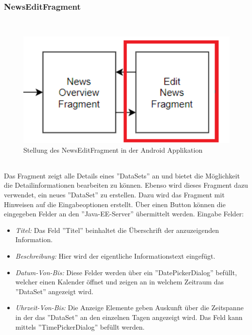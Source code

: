 \subsubsection{NewsEditFragment}
\\
\begin{figure}[H]
\centering
\includegraphics[width=1.0\textwidth]{images/06_AndroidApp/06_NewsEditStellung}
\caption{Stellung des NewsEditFragment in der Android Applikation}
\label{fig:mediaNav}
\end{figure}
\\
Das Fragment zeigt alle Details eines ''DataSets'' an und bietet die Möglichkeit die Detailinformationen bearbeiten zu können. Ebenso wird dieses Fragment dazu verwendet, ein neues ''DataSet'' zu erstellen. Dazu wird das Fragment mit Hinweisen auf die Eingabeoptionen erstellt. Über einen Button können die eingegeben Felder an den ''Java-EE-Server'' übermittelt werden. Eingabe Felder:
\begin{itemize}
	\item {\em Titel:} Das Feld ''Titel'' beinhaltet die Überschrift der anzuzeigenden Information.
	\item {\em Beschreibung:} Hier wird der eigentliche Informationstext eingefügt.
	\item{\em Datum-Von-Bis:} Diese Felder werden über ein ''DatePickerDialog'' befüllt, welcher einen Kalender öffnet und zeigen an in welchem Zeitraum das ''DataSet'' angezeigt wird. 
	\item {\em Uhrzeit-Von-Bis:} Die Anzeige Elemente geben Auskunft über die Zeitspanne in der das ''DataSet'' an den einzelnen Tagen angezeigt wird. Das Feld kann mittels ''TimePickerDialog'' befüllt werden.		
\end{itemize}
